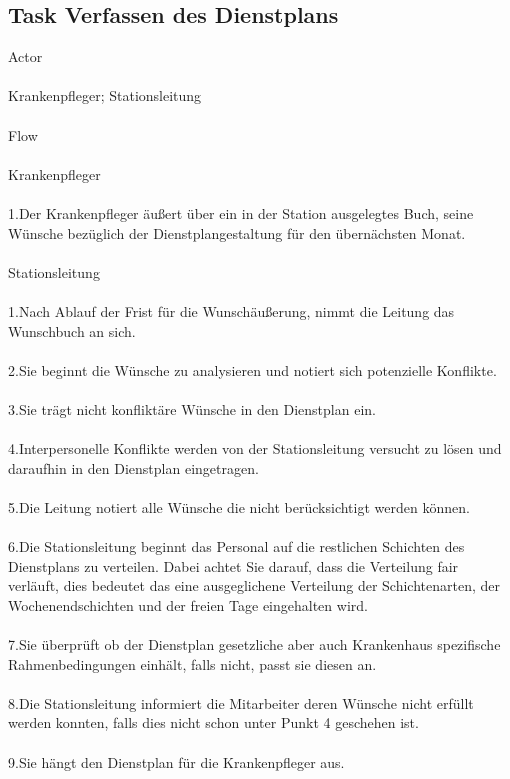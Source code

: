 \documentclass[11pt,
paper=a4,
bibtotocnumbered,	  %
liststotocnumbered,  %
DIV=calc,		  %
tablecaptionabove,	  %
headinclude,
]{article}
\begin{document}
\subsection{Task Verfassen des Dienstplans}
Actor\\\\
Krankenpfleger; Stationsleitung \\\\
Flow\\\\
Krankenpfleger \\\\
1.Der Krankenpfleger äußert über ein in der Station ausgelegtes Buch, seine Wünsche bezüglich der Dienstplangestaltung für den übernächsten Monat.\\\\
Stationsleitung\\\\
1.Nach Ablauf der Frist für die Wunschäußerung, nimmt die Leitung das Wunschbuch an sich.\\\\
2.Sie beginnt die Wünsche zu analysieren und notiert sich potenzielle Konflikte.\\\\
3.Sie trägt nicht konfliktäre Wünsche in den Dienstplan ein.\\\\
4.Interpersonelle Konflikte werden von der Stationsleitung versucht zu lösen und daraufhin in den Dienstplan eingetragen.\\\\
5.Die Leitung notiert alle Wünsche die nicht berücksichtigt werden können.\\\\
6.Die Stationsleitung beginnt das Personal auf die restlichen Schichten des Dienstplans zu verteilen. Dabei achtet Sie darauf, dass die Verteilung fair verläuft, dies bedeutet das eine ausgeglichene Verteilung der Schichtenarten, der Wochenendschichten und der freien Tage eingehalten wird.\\\\
7.Sie überprüft ob der Dienstplan gesetzliche aber auch Krankenhaus spezifische Rahmenbedingungen einhält, falls nicht, passt sie diesen an.\\\\
8.Die Stationsleitung informiert die Mitarbeiter deren Wünsche nicht erfüllt werden konnten, falls dies nicht schon unter Punkt 4 geschehen ist.\\\\
9.Sie hängt den Dienstplan für die Krankenpfleger aus.\\\\
\end{document}
